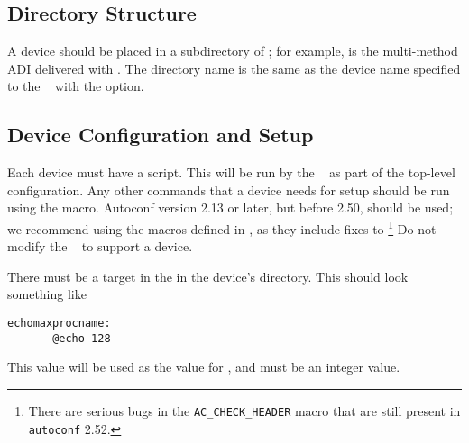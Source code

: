 \subsection{Directory Structure}
\label{sec:adi3-dirs}
A device should be placed in a subdirectory of ;
for example,  is the multi-method ADI
delivered with \mpich.  The directory name is the same as the device
name specified to the \mpich\  with the
 option.

\subsection{Device Configuration and Setup}
\label{sec:adi3-setup}
Each device must have a  script.  This will be run by
the \mpich\  as part of the top-level configuration.
Any other commands that a device needs for setup should be run using
the   macro.  Autoconf version
2.13 or later, but before 2.50, should be used; we recommend using the
macros defined in 
, as they include fixes to
\footnote{There are serious bugs in the
\texttt{AC_CHECK_HEADER} macro that are still present in
\texttt{autoconf} 2.52.}
Do not modify the \mpich\  to support a device.

There must be a  target in the 
in the device's directory.  This should look something like
\begin{verbatim}
echomaxprocname:
       @echo 128
\end{verbatim}
This value will be used as the value for
, and must be an integer value.

